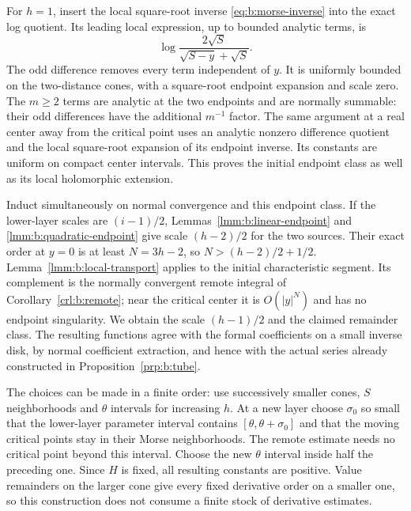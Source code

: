 \begin{prf}
For $h=1$, insert the local square-root inverse
\eqref{eq:b:morse-inverse} into the exact log quotient. Its leading
local expression, up to bounded analytic terms, is
\[
 \log\frac{2\sqrt S}{\sqrt{S-y}+\sqrt S}.
\]
The odd difference removes every term independent of $y$.
It is uniformly bounded on the two-distance cones, with a
square-root endpoint expansion and scale zero. The $m\geq2$
terms are analytic at the two endpoints and are normally summable:
their odd differences have the additional $m^{-1}$ factor.
The same argument at a real center away from the critical point
uses an analytic nonzero difference quotient and the local
square-root expansion of its endpoint inverse. Its constants are
uniform on compact center intervals. This proves the initial
endpoint class as well as its local holomorphic extension.

Induct simultaneously on normal convergence and this endpoint class.
If the lower-layer scales are $(i-1)/2$,
Lemmas~\ref{lmm:b:linear-endpoint} and
\ref{lmm:b:quadratic-endpoint} give scale $(h-2)/2$ for the two
sources. Their exact order at $y=0$ is at least $N=3h-2$, so
$N>(h-2)/2+1/2$. Lemma~\ref{lmm:b:local-transport} applies to
the initial characteristic segment. Its complement is the normally
convergent remote integral of Corollary~\ref{crl:b:remote}; near
the critical center it is $O(|y|^N)$ and has no endpoint singularity.
We obtain the scale $(h-1)/2$ and the claimed remainder class.
The resulting functions agree with the formal coefficients on a
small inverse disk, by normal coefficient extraction, and hence
with the actual series already constructed in
Proposition~\ref{prp:b:tube}.

The choices can be made in a finite order: use successively smaller
cones, $S$ neighborhoods and $\theta$ intervals for increasing $h$.
At a new layer choose $\sigma_0$ so small that the lower-layer
parameter interval contains $[\theta,\theta+\sigma_0]$ and that
the moving critical points stay in their Morse neighborhoods.
The remote estimate needs no critical point beyond this interval.
Choose the new $\theta$ interval inside half the preceding one.
Since $H$ is fixed, all resulting constants are positive.
Value remainders on the larger cone give every fixed derivative
order on a smaller one, so this construction does not consume a
finite stock of derivative estimates.


\end{prf}
